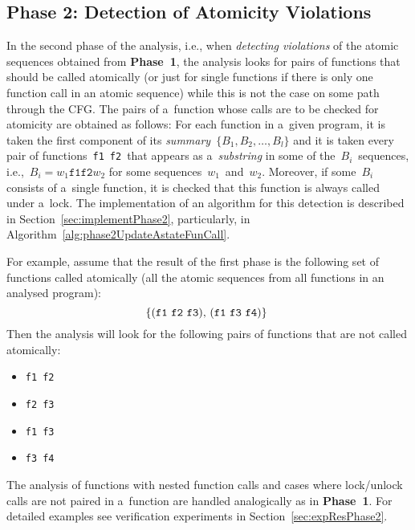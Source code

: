 \subsection{Phase 2: Detection of Atomicity Violations}
\label{sec:designPhase2}

In the second phase of the analysis, i.e., when \emph{detecting
violations} of the atomic sequences obtained from \textbf{Phase~1}, the
analysis looks for pairs of functions that should be called atomically
(or just for single functions if there is only one function call in an
atomic sequence) while this is not the case on some path through the CFG.
The pairs of a~function whose calls are to be checked for atomicity are
obtained as follows: For each function in a~given program, it is taken
the first component of its \emph{summary}~$ \{B_1, B_2, \ldots, B_l\} $
and it is taken every pair of functions~\texttt{f1}~\texttt{f2}~that
appears as a~\emph{substring} in some of the~$ B_i $~sequences,
i.e.,~$ B_i = w_1\mathtt{f1f2}w_2 $ for some sequences~$ w_1 $~and~$ w_2 $.
Moreover, if some~$ B_i $ consists of a~single function, it is checked
that this function is always called under a~lock. The implementation of
an algorithm for this detection is described in
Section~\ref{sec:implementPhase2}, particularly, in
Algorithm~\ref{alg:phase2UpdateAstateFunCall}.

\begin{example}
    For example, assume that the result of the first phase is the following
    set of functions called atomically (all the atomic sequences from
    all functions in an analysed program):
    $$
        \text{%
            \{(\texttt{f1}~\texttt{f2}~\texttt{f3}),
            (\texttt{f1}~\texttt{f3}~\texttt{f4})\}
        }
    $$
    Then the analysis will look
    for the following pairs of functions that are not called atomically:
    \begin{itemize}
        \item \texttt{f1}~\texttt{f2}
        \item \texttt{f2}~\texttt{f3}
        \item \texttt{f1}~\texttt{f3}
        \item \texttt{f3}~\texttt{f4}
    \end{itemize}
\end{example}

The analysis of functions with nested function calls and cases where
lock/unlock calls are not paired in a~function are handled analogically
as in \textbf{Phase~1}. For detailed examples see verification experiments
in Section~\ref{sec:expResPhase2}.

